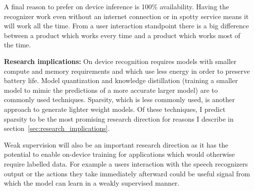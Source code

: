 A final reason to prefer on device inference is 100\% availability. Having the
recognizer work even without an internet connection or in spotty service means
it will work all the time. From a user interaction standpoint there is a big
difference between a product which works every time and a product which works
most of the time.

{\bf Research implications:} On device recognition requires models with smaller
compute and memory requirements and which use less energy in order to preserve
battery life. Model quantization and knowledge distillation (training a smaller
model to mimic the predictions of a more accurate larger model) are to commonly
used techniques. Sparsity, which is less commonly used, is another approach to
generate lighter weight models. Of these techniques, I predict sparsity to be
the most promising research direction for reasons I describe in
section~\ref{sec:research_implications}.

Weak supervision will also be an important research direction as it has the
potential to enable on-device training for applications which would otherwise
require labelled data. For example a users interaction with the speech
recognizers output or the actions they take immediately afterward could be
useful signal from which the model can learn in a weakly supervised manner.

